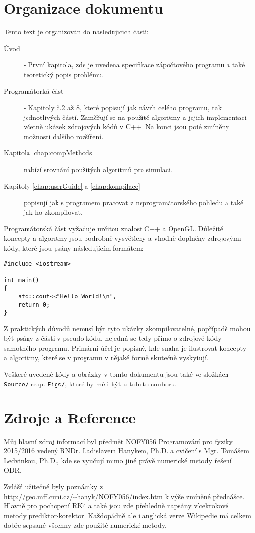 
\chapter*{Organizace dokumentu}
Tento text je organizován do následujících částí:
\begin{description}
	\item[Úvod] - První kapitola, zde je uvedena specifikace zápočtového programu a také teoretický popis problému.
	\item[Programátorká část] - Kapitoly č.2 až 8, které popisují jak návrh celého programu, tak jednotlivých částí. Zaměřují se na použité algoritmy a jejich implementaci včetně ukázek zdrojových kódů v C++. Na konci jsou poté zmíněny možnosti dalšího rozšíření.
	\item[Kapitola \ref{chap:compMethods} ] nabízí srovnání použitých algoritmů pro simulaci.
	\item[Kapitoly \ref{chap:userGuide} a \ref{chap:kompilace}] popisují jak s programem pracovat z neprogramátorského pohledu a také jak ho zkompilovat.
\end{description}
Programátorská část vyžaduje určitou znalost C++ a OpenGL. Důležité koncepty a algoritmy jsou podrobně vysvětleny a vhodně doplněny zdrojovými kódy, které jsou psány následujícím formátem:
\begin{lstlisting}[title=Název vystihující příklad]
#include <iostream>

int main()
{
	std::cout<<"Hello World!\n";
	return 0;
}
\end{lstlisting}
Z praktických důvodů nemusí být tyto ukázky zkompilovatelné, popřípadě mohou být psány z části v pseudo-kódu, nejedná se tedy přímo o zdrojové kódy samotného programu. Primární účel je popisný, kde snaha je ilustrovat koncepty a algoritmy, které se v programu v nějaké formě skutečně vyskytují.

Veškeré uvedené kódy a obrázky v tomto dokumentu jsou také ve složkách \texttt{Source/} resp. \texttt{Figs/}, které by měli být u tohoto souboru.

\chapter*{Zdroje a Reference}
Můj hlavní zdroj informací byl předmět NOFY056 Programování pro fyziky 2015/2016 vedený RNDr. Ladislavem Hanykem, Ph.D. a cvičení s Mgr. Tomášem Ledvinkou, Ph.D., kde se vyučují mimo jiné právě numerické metody řešení ODR. 

Zvlášť užitečné byly poznámky z \url{http://geo.mff.cuni.cz/~hanyk/NOFY056/index.htm} k výše zmíněné přednášce. Hlavně pro pochopení RK4 a také jsou zde přehledně napsány vícekrokové metody prediktor-korektor. Každopádně ale i anglická verze Wikipedie má celkem dobře sepsané všechny zde použité numerické metody.
